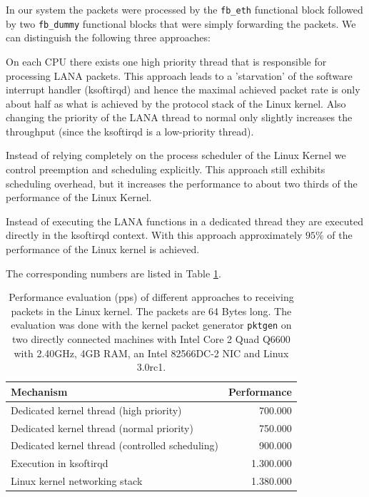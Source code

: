 \documentclass{sig-alternate}
\begin{document}
In our system the packets were processed by the \texttt{fb\_eth} functional 
block followed by two \texttt{fb\_dummy} functional blocks that were simply 
forwarding the packets. We can distinguish the following three approaches:
\begin{compactitem}
\item On each CPU there exists one high priority thread that is responsible 
      for processing LANA packets. This approach leads to a 'starvation' of 
      the software interrupt handler (ksoftirqd) and hence the maximal achieved 
      packet rate is only about half as what is achieved by the protocol 
      stack of the Linux kernel. Also changing the priority of the LANA 
      thread to normal only slightly increases the throughput (since the 
      ksoftirqd is a low-priority thread).
\item Instead of relying completely on the process scheduler of the 
      Linux Kernel we control preemption and scheduling explicitly. This 
      approach still exhibits scheduling overhead, but it increases the 
      performance to about two thirds of the performance of the Linux 
      Kernel.
\item Instead of executing the LANA functions in a dedicated thread they 
      are executed directly in the ksoftirqd context. With this approach 
      approximately $95\%$ of the performance of the Linux kernel is achieved.
\end{compactitem}

The corresponding numbers are listed in Table \ref{tab:performance}.
\begin{table}[htb]
\begin{tabular}{ l r }
Mechanism & Performance\\
\hline
Dedicated kernel thread (high priority) & 700.000\\
Dedicated kernel thread (normal priority) & 750.000\\
Dedicated kernel thread (controlled scheduling) & 900.000\\
Execution in ksoftirqd & 1.300.000\\
Linux kernel networking stack & 1.380.000\\
\end{tabular}
\caption{Performance evaluation (pps) of different approaches to receiving 
packets in the Linux kernel. The packets are 64 Bytes long. The evaluation 
was done with the kernel packet generator \texttt{pktgen} on two directly 
connected machines with Intel Core 2 Quad Q6600 with 2.40GHz, 4GB RAM, an 
Intel 82566DC-2 NIC and Linux 3.0rc1.}
\label{tab:performance}
\end{table}
\end{document}
